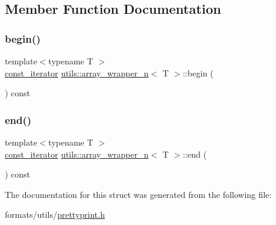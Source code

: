 \subsection{Member Function Documentation}
\mbox{\label{structutils_1_1array__wrapper__n_a18ea8eb8f61eb3556756456002ca9319}} 
\subsubsection{\texorpdfstring{begin()}{begin()}}
{\footnotesize\ttfamily template$<$typename T $>$ \\
\mbox{\hyperlink{structutils_1_1array__wrapper__n_adb47a0f037e288f0ba32d90176849e3d}{const\+\_\+iterator}} \mbox{\hyperlink{structutils_1_1array__wrapper__n}{utils\+::array\+\_\+wrapper\+\_\+n}}$<$ T $>$\+::begin (\begin{DoxyParamCaption}{ }\end{DoxyParamCaption}) const\hspace{0.3cm}{\ttfamily [inline]}}

\mbox{\label{structutils_1_1array__wrapper__n_a6f5d8776a0a44be465b8737983199edd}} 
\subsubsection{\texorpdfstring{end()}{end()}}
{\footnotesize\ttfamily template$<$typename T $>$ \\
\mbox{\hyperlink{structutils_1_1array__wrapper__n_adb47a0f037e288f0ba32d90176849e3d}{const\+\_\+iterator}} \mbox{\hyperlink{structutils_1_1array__wrapper__n}{utils\+::array\+\_\+wrapper\+\_\+n}}$<$ T $>$\+::end (\begin{DoxyParamCaption}{ }\end{DoxyParamCaption}) const\hspace{0.3cm}{\ttfamily [inline]}}



The documentation for this struct was generated from the following file\+:\begin{DoxyCompactItemize}
\item 
formats/utils/\mbox{\hyperlink{prettyprint_8h}{prettyprint.\+h}}\end{DoxyCompactItemize}

